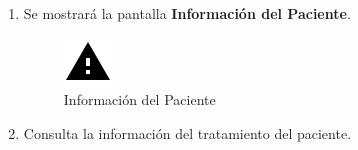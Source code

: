 \begin{enumerate}
	\item Se mostrará la pantalla \textbf{Información del Paciente}.
	\newpage
	\begin{figure}[!htbp]			
		\hypertarget{fig:infoPacientes}{\hspace{1pt}}
		\begin{center}
			\includegraphics[height=0.4\textheight]{images/Iconos/Advertencia}
			\caption{Información del Paciente}
			\label{fig:infoPacientes}
		\end{center}
	\end{figure}

	\item Consulta la información del tratamiento del paciente.


\end{enumerate}

